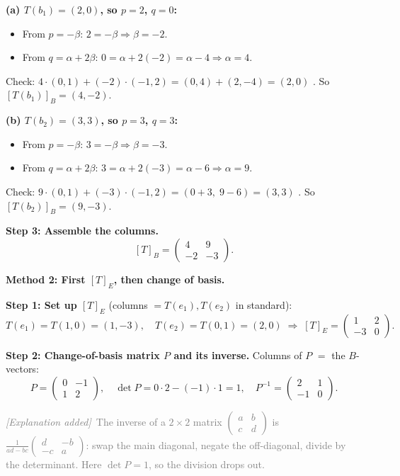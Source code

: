 \documentclass[a4paper,12pt]{article}
\newcommand{\erglerk}{\textcolor{gray}{\small\textit{[Explanation added]}}}
\begin{document}
\smallskip
\textbf{(a) $T(b_1) = (2, 0)$, so $p = 2$, $q = 0$:}
\begin{itemize}[leftmargin=*, nosep]
    \item From $p = -\beta$: \; $2 = -\beta \Rightarrow \beta = -2$.
    \item From $q = \alpha + 2\beta$: \; $0 = \alpha + 2(-2) = \alpha - 4 \Rightarrow \alpha = 4$.
\end{itemize}
Check: $4 \cdot (0,1) + (-2)\cdot(-1,2) = (0, 4) + (2, -4) = (2, 0)$ \checkmark. \quad So $[T(b_1)]_B = (4, -2)$.

\smallskip
\textbf{(b) $T(b_2) = (3, 3)$, so $p = 3$, $q = 3$:}
\begin{itemize}[leftmargin=*, nosep]
    \item From $p = -\beta$: \; $3 = -\beta \Rightarrow \beta = -3$.
    \item From $q = \alpha + 2\beta$: \; $3 = \alpha + 2(-3) = \alpha - 6 \Rightarrow \alpha = 9$.
\end{itemize}
Check: $9 \cdot (0,1) + (-3)\cdot(-1,2) = (0+3,\; 9-6) = (3, 3)$ \checkmark. \quad So $[T(b_2)]_B = (9, -3)$.

\textbf{Step 3: Assemble the columns.}
\[
[T]_B = \begin{pmatrix} 4 & 9 \\ -2 & -3 \end{pmatrix}.
\]

\bigskip

\textbf{Method 2: First $[T]_E$, then change of basis.}

\textbf{Step 1: Set up $[T]_E$} (columns $= T(e_1), T(e_2)$ in standard):
\[
T(e_1) = T(1,0) = (1, -3), \quad T(e_2) = T(0,1) = (2, 0)
\;\Rightarrow\;
[T]_E = \begin{pmatrix} 1 & 2 \\ -3 & 0 \end{pmatrix}.
\]

\textbf{Step 2: Change-of-basis matrix $P$ and its inverse.} Columns of $P$ $=$ the $B$-vectors:
\[
P = \begin{pmatrix} 0 & -1 \\ 1 & 2 \end{pmatrix}, \quad
\det P = 0\cdot 2 - (-1)\cdot 1 = 1, \quad
P^{-1} = \begin{pmatrix} 2 & 1 \\ -1 & 0 \end{pmatrix}.
\]

\erglerk\ \textcolor{gray}{\small The inverse of a $2\times 2$ matrix $\left(\begin{smallmatrix} a & b \\ c & d \end{smallmatrix}\right)$ is $\frac{1}{ad-bc}\left(\begin{smallmatrix} d & -b \\ -c & a \end{smallmatrix}\right)$: swap the main diagonal, negate the off-diagonal, divide by the determinant. Here $\det P = 1$, so the division drops out.}
\end{document}
